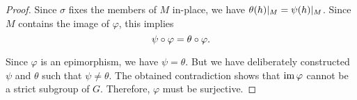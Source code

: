 \begin{proof}
  Since \( \sigma \) fixes the members of \( M \) in-place, we have \( \theta(h)\vert_M = \psi(h)\vert_M \). Since \( M \) contains the image of \( \varphi \), this implies
  \begin{equation*}
    \psi \bincirc \varphi = \theta \bincirc \varphi.
  \end{equation*}

  Since \( \varphi \) is an epimorphism, we have \( \psi = \theta \). But we have deliberately constructed \( \psi \) and \( \theta \) such that \( \psi \neq \theta \). The obtained contradiction shows that \( \operatorname{im} \varphi \) cannot be a strict subgroup of \( G \). Therefore, \( \varphi \) must be surjective.
\end{proof}
